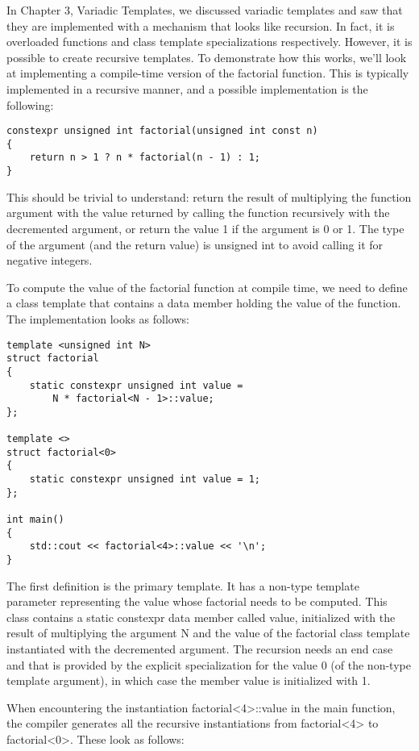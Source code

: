 In Chapter 3, Variadic Templates, we discussed variadic templates and saw that they are implemented with a mechanism that looks like recursion. In fact, it is overloaded functions and class template specializations respectively. However, it is possible to create recursive templates. To demonstrate how this works, we’ll look at implementing a compile-time version of the factorial function. This is typically implemented in a recursive manner, and a possible implementation is the following:

\begin{lstlisting}[style=styleCXX]
constexpr unsigned int factorial(unsigned int const n)
{
	return n > 1 ? n * factorial(n - 1) : 1;
}
\end{lstlisting}

This should be trivial to understand: return the result of multiplying the function argument with the value returned by calling the function recursively with the decremented argument, or return the value 1 if the argument is 0 or 1. The type of the argument (and the return value) is unsigned int to avoid calling it for negative integers.

To compute the value of the factorial function at compile time, we need to define a class template that contains a data member holding the value of the function. The implementation looks as follows:

\begin{lstlisting}[style=styleCXX]
template <unsigned int N>
struct factorial
{
	static constexpr unsigned int value =
		N * factorial<N - 1>::value;
};

template <>
struct factorial<0>
{
	static constexpr unsigned int value = 1;
};

int main()
{
	std::cout << factorial<4>::value << '\n';
}
\end{lstlisting}

The first definition is the primary template. It has a non-type template parameter representing the value whose factorial needs to be computed. This class contains a static constexpr data member called value, initialized with the result of multiplying the argument N and the value of the factorial class template instantiated with the decremented argument. The recursion needs an end case and that is provided by the explicit specialization for the value 0 (of the non-type template argument), in which case the member value is initialized with 1.

When encountering the instantiation factorial<4>::value in the main function, the compiler generates all the recursive instantiations from factorial<4> to factorial<0>. These look as follows:

